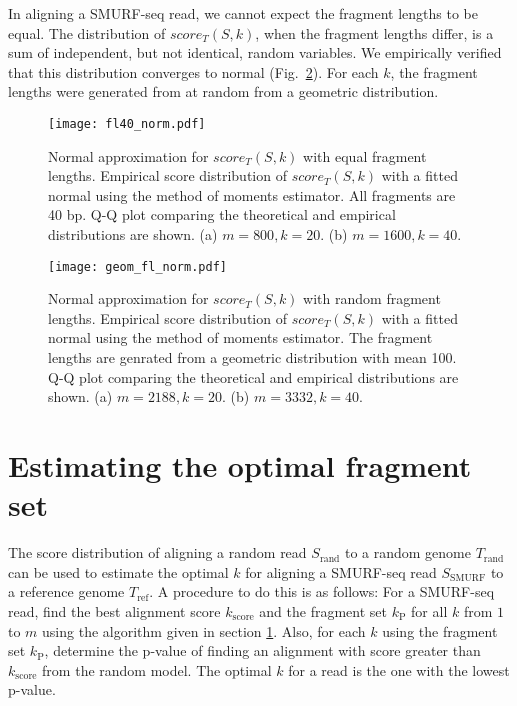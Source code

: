 In aligning a SMURF-seq read, we cannot expect the fragment lengths to
be equal. The distribution of $score_T(S,k)$, when the fragment lengths
differ, is a sum of independent, but not identical, random variables. We
empirically verified that this distribution converges to normal
(Fig.~\ref{norm_geom}). For each $k$, the fragment lengths were
generated from at random from a geometric distribution.

\begin{figure}[H]
\centering
\texttt{[image: fl40\_norm.pdf]}
\caption[Normal approximation for $score_T(S,k)$ with equal fragment
  lengths]{
  Normal approximation for $score_T(S,k)$ with equal fragment lengths.
  Empirical score distribution of $score_T(S,k)$ with a fitted
  normal using the method of moments estimator. All fragments are 40 bp.
  Q-Q plot comparing the theoretical and empirical distributions are shown.
  (a) $m=800, k=20$.
  (b) $m=1600, k=40$.}
\label{norm_const}
\end{figure}

\begin{figure}[H]
\centering
\texttt{[image: geom\_fl\_norm.pdf]}
\caption[Normal approximation for $score_T(S,k)$ with random fragment
  lengths]{
  Normal approximation for $score_T(S,k)$ with random fragment lengths.
  Empirical score distribution of $score_T(S,k)$ with a fitted
  normal using the method of moments estimator. The fragment lengths are
  genrated from a geometric distribution with mean 100. Q-Q plot comparing
  the theoretical and empirical distributions are shown.
  (a) $m=2188, k=20$.
  (b) $m=3332, k=40$.}
\label{norm_geom}
\end{figure}


\section{Estimating the optimal fragment set}
The score distribution of aligning a random read $S_\mathrm{rand}$ to a
random genome $T_\mathrm{rand}$ can be used to estimate the optimal $k$
for aligning a SMURF-seq read $S_\mathrm{SMURF}$ to a reference genome
$T_\mathrm{ref}$.
A procedure to do this is as follows: For a SMURF-seq read, find the
best alignment score $k_\mathrm{score}$ and the fragment set
$k_\mathrm{P}$ for all $k$ from $1$ to $m$ using the algorithm given
in section \ref{}. Also, for each $k$ using the fragment set
$k_\mathrm{P}$, determine the p-value of finding an alignment with score
greater than $k_\mathrm{score}$ from the random model. The optimal $k$
for a read is the one with the lowest p-value.

